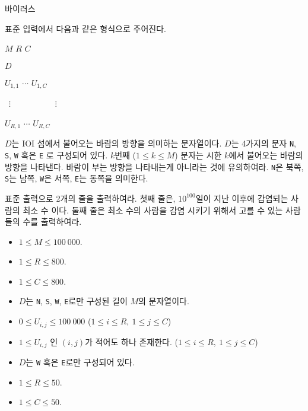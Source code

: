 \begin{problem}{바이러스}
	
	\InputFile
	
	표준 입력에서 다음과 같은 형식으로 주어진다. 
	
	$M$ $R$ $C$
	
	$D$
	
	$U_{1, 1}$ $\cdots$ $U_{1, C}$

	\ $\vdots$ \ \ \ \ \ \ \ \ \ \ $\vdots$	
	
	$U_{R, 1}$ $\cdots$ $U_{R, C}$
	
	$D$는 IOI 섬에서 불어오는 바람의 방향을 의미하는 문자열이다. $D$는 4가지의 문자 \texttt{N}, \texttt{S}, \texttt{W} 혹은 \texttt{E} 로 구성되어 있다. $k$번째 ($1 \le k \le M$) 문자는 시한 $k$에서 불어오는 바람의 방향을 나타낸다. 바람이 부는 방향을 나타내는게 아니라는 것에 유의하여라. \texttt{N}은 북쪽, \texttt{S}는 남쪽, \texttt{W}은 서쪽, \texttt{E}는 동쪽을 의미한다.
	
	\OutputFile
	
	표준 출력으로 2개의 줄을 출력하여라.
	첫째 줄은, $10^{100}$일이 지난 이후에 감염되는 사람의 최소 수 이다. 둘째 줄은 최소 수의 사람을 감염 시키기 위해서 고를 수 있는 사람들의 수를 출력하여라.
	
	\Constraints
	
	\begin{itemize}
		
		\item $1 \le M \le 100\ 000$.
		\item $1 \le R \le 800$.
		\item $1 \le C \le 800$.
		\item $D$는 \texttt{N}, \texttt{S}, \texttt{W}, \texttt{E}로만 구성된 길이 $M$의 문자열이다.
		\item $0 \le U_{i, j} \le 100\ 000$ ($1 \le i \le R, \ 1 \le j \le C$)
		\item $1 \le U_{i, j}$ 인 $(i, j)$가 적어도 하나 존재한다. ($1 \le i \le R, \ 1 \le j \le C$)
	\end{itemize}
	
	
	\begin{itemize}
		\item $D$는 \texttt{W} 혹은 \texttt{E}로만 구성되어 있다.
	\end{itemize}
	
	\begin{itemize}
		\item $1 \le R \le 50$.
		\item $1 \le C \le 50$.
	\end{itemize}
	

\end{problem}
